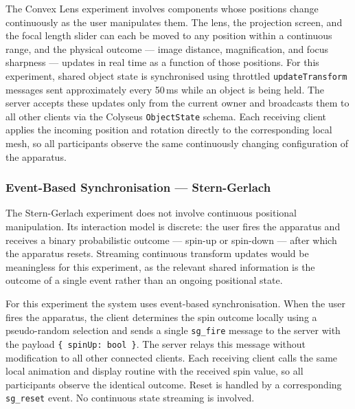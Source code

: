 The Convex Lens experiment involves components whose positions change
continuously as the user manipulates them. The lens, the projection
screen, and the focal length slider can each be moved to any position
within a continuous range, and the physical outcome --- image distance,
magnification, and focus sharpness --- updates in real time as a function
of those positions. For this experiment, shared object state is
synchronised using throttled \texttt{updateTransform} messages sent
approximately every 50\,ms while an object is being held. The server
accepts these updates only from the current owner and broadcasts them to
all other clients via the Colyseus \texttt{ObjectState} schema. Each
receiving client applies the incoming position and rotation directly to
the corresponding local mesh, so all participants observe the same
continuously changing configuration of the apparatus.

\subsubsection{Event-Based Synchronisation — Stern-Gerlach}

The Stern-Gerlach experiment does not involve continuous positional
manipulation. Its interaction model is discrete: the user fires the
apparatus and receives a binary probabilistic outcome --- spin-up or
spin-down --- after which the apparatus resets. Streaming continuous
transform updates would be meaningless for this experiment, as the
relevant shared information is the outcome of a single event rather than
an ongoing positional state.

For this experiment the system uses event-based synchronisation. When
the user fires the apparatus, the client determines the spin outcome
locally using a pseudo-random selection and sends a single
\texttt{sg\_fire} message to the server with the payload
\texttt{\{\ spinUp:\ bool\ \}}. The server relays this message without
modification to all other connected clients. Each receiving client calls
the same local animation and display routine with the received spin
value, so all participants observe the identical outcome. Reset is
handled by a corresponding \texttt{sg\_reset} event. No continuous state
streaming is involved.



